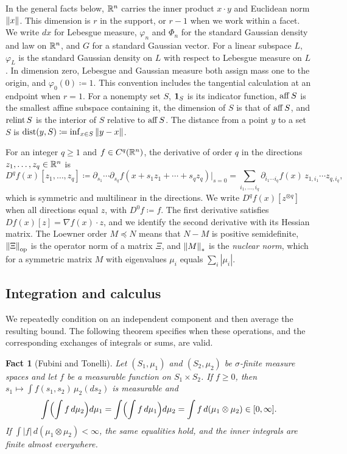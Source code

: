 \documentclass[11pt,letterpaper]{article}
\theoremstyle{plain}
\newtheorem{fact}{Fact}[section]
\begin{document}
In the general facts below, \(\mathbb R^n\) carries the inner product
\(x\cdot y\) and Euclidean norm \(\left\lVert x\right\rVert\). This dimension is \(r\)
in the support, or \(r-1\) when we work within a facet. We write \(dx\) for Lebesgue measure, \(\varphi_n\) and
\(\Phi_n\) for the standard Gaussian density and law on \(\mathbb R^n\), and \(G\)
for a standard Gaussian vector. For a linear subspace \(L\), \(\varphi_L\)
is the standard Gaussian density on \(L\) with respect to Lebesgue measure
on \(L\). In dimension zero, Lebesgue and Gaussian measure both assign
mass one to the origin, and \(\varphi_0(0)\coloneqq1\). This convention
includes the tangential calculation at an endpoint when \(r=1\).
For a nonempty set \(S\), \(\mathbf 1_S\) is its indicator function, \(\operatorname{aff} S\)
is the smallest affine subspace containing it, the dimension of \(S\) is
that of \(\operatorname{aff} S\), and \(\operatorname{relint} S\) is the interior of \(S\) relative to
\(\operatorname{aff} S\). The distance from a point \(y\) to a set \(S\) is
\(\operatorname{dist}(y,S)\coloneqq \inf_{x\in S}\left\lVert y-x\right\rVert\).

For an integer \(q\ge1\) and \(f\in C^q(\mathbb R^n)\), the derivative of order \(q\) in the directions
\(z_1,\ldots,z_q\in\mathbb R^n\) is
\[
 D^qf(x)[z_1,\ldots,z_q]
 \coloneqq \partial_{s_1}\cdots\partial_{s_q}f(x+s_1z_1+\cdots+s_qz_q)\Big|_{s=0}
 =\sum_{i_1,\ldots,i_q}\partial_{i_1\cdots i_q}f(x)\,
   z_{1,i_1}\cdots z_{q,i_q},
\]
which is symmetric and multilinear in the directions. We write
\(D^qf(x)[z^{\otimes q}]\) when all directions equal \(z\), with
\(D^0f\coloneqq f\). The first derivative satisfies
\(Df(x)[z]=\nabla f(x)\cdot z\), and we identify the second derivative
with its Hessian matrix. The Loewner order \(M\preceq N\) means that
\(N-M\) is positive semidefinite, \(\left\lVert\Xi\right\rVert_{\mathrm{op}}\) is the operator norm
of a matrix \(\Xi\), and \(\left\lVert M\right\rVert_*\) is the \emph{nuclear norm}, which for
a symmetric matrix \(M\) with eigenvalues \(\mu_i\) equals \(\sum_i|\mu_i|\).

\subsection{Integration and calculus}\label{tb:sec:calc}

We repeatedly condition on an independent component and then average the
resulting bound. The following theorem specifies when these operations,
and the corresponding exchanges of integrals or sums, are valid.

\begin{fact}[Fubini and Tonelli]\label{tb:fubini}
Let \((S_1,\mu_1)\) and \((S_2,\mu_2)\) be \(\sigma\)-finite measure
spaces and let \(f\) be a measurable function on \(S_1\times S_2\). If
\(f\ge0\), then \(s_1\mapsto\int f(s_1,s_2)\,\mu_2(ds_2)\) is measurable
and
\[
 \int\Bigl(\int f\,d\mu_2\Bigr)d\mu_1
 =\int\Bigl(\int f\,d\mu_1\Bigr)d\mu_2
 =\int f\,d(\mu_1\otimes\mu_2)\in[0,\infty].
\]
If \(\int|f|\,d(\mu_1\otimes\mu_2)<\infty\), the same equalities hold, and
the inner integrals are finite almost everywhere.
\end{fact}
\end{document}
